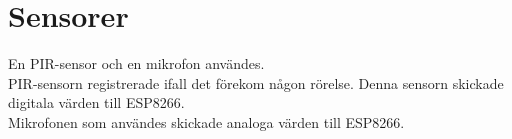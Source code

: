 \section{Sensorer}
En PIR-sensor och en mikrofon användes.\\

PIR-sensorn registrerade ifall det förekom någon rörelse. Denna sensorn skickade digitala värden till ESP8266.\\

Mikrofonen som användes skickade analoga värden till ESP8266.\\






 



